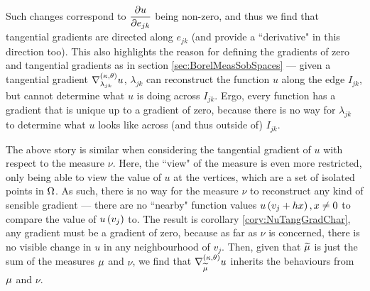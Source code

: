 Such changes correspond to $\dfrac{\partial u}{\partial e_{jk}}$ being non-zero, and thus we find that tangential gradients are directed along $e_{jk}$ (and provide a ``derivative" in this direction too).
This also highlights the reason for defining the gradients of zero and tangential gradients as in section \ref{sec:BorelMeasSobSpaces} --- given a tangential gradient $\nabla^{\left( \kappa, \theta \right)}_{\lambda_{jk}}u$, $\lambda_{jk}$ can reconstruct the function $u$ along the edge $I_{jk}$, but cannot determine what $u$ is doing across $I_{jk}$.
Ergo, every function has a gradient that is unique up to a gradient of zero, because there is no way for $\lambda_{jk}$ to determine what $u$ looks like across (and thus outside of) $I_{jk}$.

The above story is similar when considering the tangential gradient of $u$ with respect to the measure $\nu$.
Here, the ``view" of the measure is even more restricted, only being able to view the value of $u$ at the vertices, which are a set of isolated points in $\Omega$.
As such, there is no way for the measure $\nu$ to reconstruct any kind of sensible gradient --- there are no ``nearby" function values $u\left( v_j + h x \right), x\neq 0$ to compare the value of $u\left( v_j \right)$ to.
The result is corollary \ref{cory:NuTangGradChar}, any gradient must be a gradient of zero, because as far as $\nu$ is concerned, there is no visible change in $u$ in any neighbourhood of $v_j$.
Then, given that $\widetilde{\mu}$  is just the sum of the measures $\mu$ and $\nu$, we find that $\nabla^{\left( \kappa, \theta \right)}_{\widetilde{\mu}}u$ inherits the behaviours from $\mu$ and $\nu$.